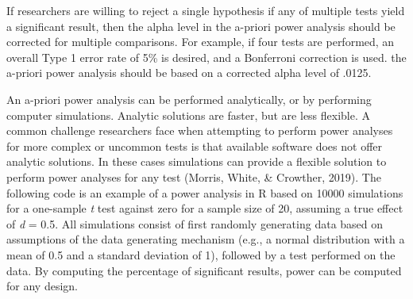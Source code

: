 \documentclass[
  english,
  ,jou, a4paper,floatsintext]{apa6}
\newenvironment{Shaded}{\begin{snugshade}}{\end{snugshade}}
\newcommand{\ControlFlowTok}[1]{\textcolor[rgb]{0.13,0.29,0.53}{\textbf{#1}}}
\newcommand{\DataTypeTok}[1]{\textcolor[rgb]{0.13,0.29,0.53}{#1}}
\newcommand{\DecValTok}[1]{\textcolor[rgb]{0.00,0.00,0.81}{#1}}
\newcommand{\FloatTok}[1]{\textcolor[rgb]{0.00,0.00,0.81}{#1}}
\newcommand{\KeywordTok}[1]{\textcolor[rgb]{0.13,0.29,0.53}{\textbf{#1}}}
\newcommand{\NormalTok}[1]{#1}
\newcommand{\OperatorTok}[1]{\textcolor[rgb]{0.81,0.36,0.00}{\textbf{#1}}}
\newcommand{\StringTok}[1]{\textcolor[rgb]{0.31,0.60,0.02}{#1}}
\begin{document}
If researchers are willing to reject a single hypothesis if any of multiple tests yield a significant result, then the alpha level in the a-priori power analysis should be corrected for multiple comparisons. For example, if four tests are performed, an overall Type 1 error rate of 5\% is desired, and a Bonferroni correction is used. the a-priori power analysis should be based on a corrected alpha level of .0125.

An a-priori power analysis can be performed analytically, or by performing computer simulations. Analytic solutions are faster, but are less flexible. A common challenge researchers face when attempting to perform power analyses for more complex or uncommon tests is that available software does not offer analytic solutions. In these cases simulations can provide a flexible solution to perform power analyses for any test (Morris, White, \& Crowther, 2019). The following code is an example of a power analysis in R based on 10000 simulations for a one-sample \emph{t} test against zero for a sample size of 20, assuming a true effect of \emph{d} = 0.5. All simulations consist of first randomly generating data based on assumptions of the data generating mechanism (e.g., a normal distribution with a mean of 0.5 and a standard deviation of 1), followed by a test performed on the data. By computing the percentage of significant results, power can be computed for any design.

\begin{Shaded}
\end{Shaded}
\end{document}
